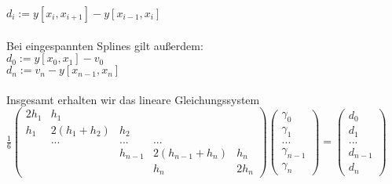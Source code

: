 \documentclass[a4paper]{scrreprt}
\begin{document}
$d_i := y[x_i,x_{i+1}]-y[x_{i-1},x_i]$\\\\
Bei eingespannten Splines gilt außerdem:\\
$d_0 := y[x_0,x_1] - v_0$\\
$d_n := v_n - y[x_{n-1},x_n]$\\\\

Insgesamt erhalten wir das lineare Gleichungssystem\\
$\frac{1}{6}\begin{pmatrix}
2h_1 & h_1\\
h_1 & 2(h_1 + h_2) & h_2\\
    & ... & ... & ...\\
& & h_{n-1} & 2(h_{n-1}+h_n) & h_n\\
& & & h_n & 2h_n
\end{pmatrix}
\begin{pmatrix}\gamma_0\\\gamma_1\\...\\\gamma_{n-1}\\\gamma_n\end{pmatrix}=
\begin{pmatrix}d_0\\d_1\\...\\d_{n-1}\\d_n\end{pmatrix}$
\end{document}
